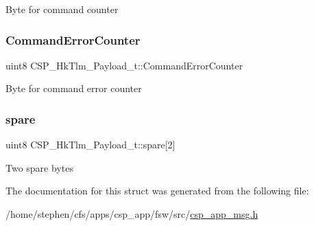 Byte for command counter \mbox{\label{structCSP__HkTlm__Payload__t_a6b79d521c2dcef2c8850fb6b412a24f7}} 
\subsubsection{\texorpdfstring{Command\+Error\+Counter}{CommandErrorCounter}}
{\footnotesize\ttfamily uint8 C\+S\+P\+\_\+\+Hk\+Tlm\+\_\+\+Payload\+\_\+t\+::\+Command\+Error\+Counter}

Byte for command error counter \mbox{\label{structCSP__HkTlm__Payload__t_a7499d4238a0d765dd433a765b0c5a96e}} 
\subsubsection{\texorpdfstring{spare}{spare}}
{\footnotesize\ttfamily uint8 C\+S\+P\+\_\+\+Hk\+Tlm\+\_\+\+Payload\+\_\+t\+::spare\mbox{[}2\mbox{]}}

Two spare bytes 

The documentation for this struct was generated from the following file\+:\begin{DoxyCompactItemize}
\item 
/home/stephen/cfs/apps/csp\+\_\+app/fsw/src/\hyperlink{csp__app__msg_8h}{csp\+\_\+app\+\_\+msg.\+h}\end{DoxyCompactItemize}
